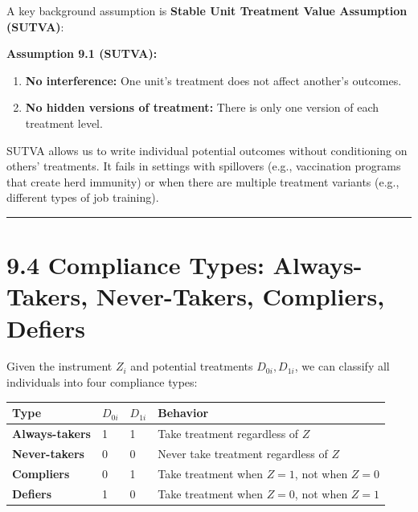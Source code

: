 A key background assumption is \textbf{Stable Unit Treatment Value Assumption (SUTVA)}:

\textbf{Assumption 9.1 (SUTVA):} 
\begin{enumerate}
\item \textbf{No interference:} One unit's treatment does not affect another's outcomes.
\item \textbf{No hidden versions of treatment:} There is only one version of each treatment level.
\end{enumerate}

SUTVA allows us to write individual potential outcomes without conditioning on others' treatments. It fails in settings with spillovers (e.g., vaccination programs that create herd immunity) or when there are multiple treatment variants (e.g., different types of job training).

\medskip\hrule\medskip

\section{9.4 Compliance Types: Always-Takers, Never-Takers, Compliers, Defiers}

Given the instrument $Z_i$ and potential treatments $D_{0i}, D_{1i}$, we can classify all individuals into four compliance types:

\begin{center}
\begin{tabular}{@{} l l l l @{}}
\toprule
\textbf{Type} & \textbf{$D_{0i}$} & \textbf{$D_{1i}$} & \textbf{Behavior} \\
\midrule
\textbf{Always-takers} & 1 & 1 & Take treatment regardless of $Z$ \\
\textbf{Never-takers} & 0 & 0 & Never take treatment regardless of $Z$ \\
\textbf{Compliers} & 0 & 1 & Take treatment when $Z=1$, not when $Z=0$ \\
\textbf{Defiers} & 1 & 0 & Take treatment when $Z=0$, not when $Z=1$ \\
\bottomrule
\end{tabular}
\end{center}

